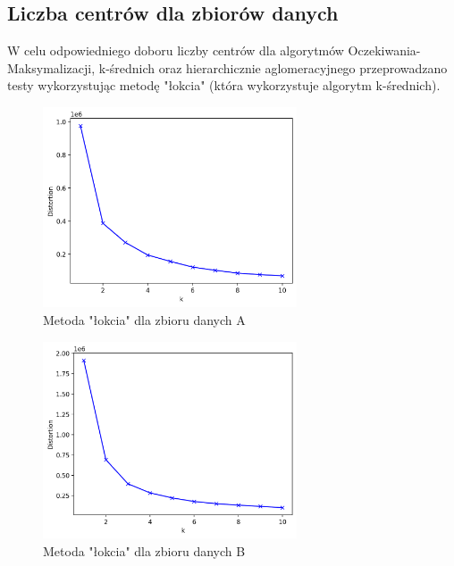 \documentclass[a4paper,11pt]{article}
\begin{document}
\subsection{Liczba centrów dla zbiorów danych}

W celu odpowiedniego doboru liczby centrów dla algorytmów Oczekiwania-Maksymalizacji, k-średnich oraz hierarchicznie aglomeracyjnego przeprowadzano testy wykorzystując metodę "łokcia" (która wykorzystuje algorytm k-średnich).

\begin{figure}[H]
    	\centering
    	\includegraphics[width=0.67\textwidth]{images2/elbow_Customer.png}
    	\caption{Metoda "łokcia" dla zbioru danych A}
    	\label{fig:e1}
\end{figure}

\begin{figure}[H]
    	\centering
    	\includegraphics[width=0.67\textwidth]{images2/elbow_Wines.png}
    	\caption{Metoda "łokcia" dla zbioru danych B}
    	\label{fig:e2}
\end{figure}
\end{document}
